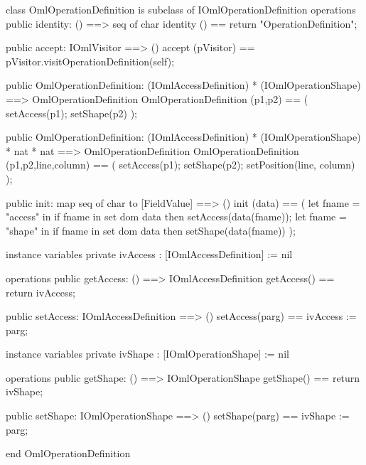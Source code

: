 \begin{vdm_al}
class OmlOperationDefinition is subclass of IOmlOperationDefinition
operations
  public identity: () ==> seq of char
  identity () == return "OperationDefinition";

  public accept: IOmlVisitor ==> ()
  accept (pVisitor) == pVisitor.visitOperationDefinition(self);

  public OmlOperationDefinition:
    (IOmlAccessDefinition) *
    (IOmlOperationShape) ==> OmlOperationDefinition
  OmlOperationDefinition (p1,p2) == 
    ( setAccess(p1);
      setShape(p2) );

  public OmlOperationDefinition:
    (IOmlAccessDefinition) *
    (IOmlOperationShape) *
    nat *
    nat ==> OmlOperationDefinition
  OmlOperationDefinition (p1,p2,line,column) == 
    ( setAccess(p1);
      setShape(p2);
      setPosition(line, column) );

  public init: map seq of char to [FieldValue] ==> ()
  init (data) ==
    ( let fname = "access" in
        if fname in set dom data
        then setAccess(data(fname));
      let fname = "shape" in
        if fname in set dom data
        then setShape(data(fname)) );

instance variables
  private ivAccess : [IOmlAccessDefinition] := nil

operations
  public getAccess: () ==> IOmlAccessDefinition
  getAccess() == return ivAccess;

  public setAccess: IOmlAccessDefinition ==> ()
  setAccess(parg) == ivAccess := parg;

instance variables
  private ivShape : [IOmlOperationShape] := nil

operations
  public getShape: () ==> IOmlOperationShape
  getShape() == return ivShape;

  public setShape: IOmlOperationShape ==> ()
  setShape(parg) == ivShape := parg;

end OmlOperationDefinition
\end{vdm_al}


